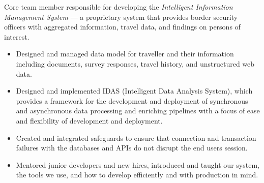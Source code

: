 \documentclass{adk_cv}
\begin{document}
\begin{minipage}[t]{\dimexpr.62\linewidth}
\begin{flushleft}
\begin{itemize}[left=0pt]
\end{itemize}

Core team member responsible for developing the \textit{Intelligent Information Management System} --- 
a proprietary system that provides border security officers with aggregated information, travel data, and 
findings on persons of interest.
\begin{itemize}[left=0pt]
\setlength\itemsep{-0.25em}
    \item Designed and managed data model for traveller and their information including documents, survey responses, travel history, and unstructured web data.
    \item Designed and implemented IDAS (Intelligent Data Analysis System), which provides a framework for the development and deployment of synchronous and asynchronous data processing and enriching pipelines with a focus of ease and flexibility of development and deployment.
    \item Created and integrated safeguards to ensure that connection and transaction failures with the databases and APIs do not disrupt the end users session.
    \item Mentored junior developers and new hires, introduced and taught our system, the tools we use, and how to develop efficiently and with production in mind.
\end{itemize}
\end{flushleft}
\end{minipage}
\end{document}
